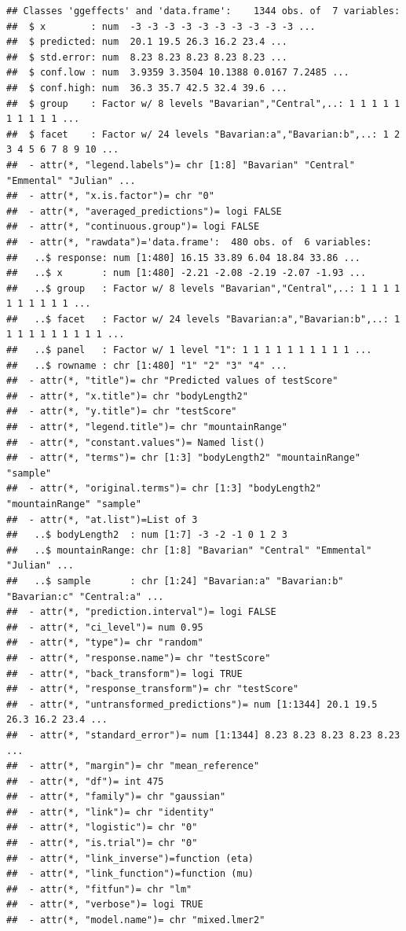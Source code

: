 \documentclass[
]{article}
\begin{document}
\begin{verbatim}
## Classes 'ggeffects' and 'data.frame':    1344 obs. of  7 variables:
##  $ x        : num  -3 -3 -3 -3 -3 -3 -3 -3 -3 -3 ...
##  $ predicted: num  20.1 19.5 26.3 16.2 23.4 ...
##  $ std.error: num  8.23 8.23 8.23 8.23 8.23 ...
##  $ conf.low : num  3.9359 3.3504 10.1388 0.0167 7.2485 ...
##  $ conf.high: num  36.3 35.7 42.5 32.4 39.6 ...
##  $ group    : Factor w/ 8 levels "Bavarian","Central",..: 1 1 1 1 1 1 1 1 1 1 ...
##  $ facet    : Factor w/ 24 levels "Bavarian:a","Bavarian:b",..: 1 2 3 4 5 6 7 8 9 10 ...
##  - attr(*, "legend.labels")= chr [1:8] "Bavarian" "Central" "Emmental" "Julian" ...
##  - attr(*, "x.is.factor")= chr "0"
##  - attr(*, "averaged_predictions")= logi FALSE
##  - attr(*, "continuous.group")= logi FALSE
##  - attr(*, "rawdata")='data.frame':  480 obs. of  6 variables:
##   ..$ response: num [1:480] 16.15 33.89 6.04 18.84 33.86 ...
##   ..$ x       : num [1:480] -2.21 -2.08 -2.19 -2.07 -1.93 ...
##   ..$ group   : Factor w/ 8 levels "Bavarian","Central",..: 1 1 1 1 1 1 1 1 1 1 ...
##   ..$ facet   : Factor w/ 24 levels "Bavarian:a","Bavarian:b",..: 1 1 1 1 1 1 1 1 1 1 ...
##   ..$ panel   : Factor w/ 1 level "1": 1 1 1 1 1 1 1 1 1 1 ...
##   ..$ rowname : chr [1:480] "1" "2" "3" "4" ...
##  - attr(*, "title")= chr "Predicted values of testScore"
##  - attr(*, "x.title")= chr "bodyLength2"
##  - attr(*, "y.title")= chr "testScore"
##  - attr(*, "legend.title")= chr "mountainRange"
##  - attr(*, "constant.values")= Named list()
##  - attr(*, "terms")= chr [1:3] "bodyLength2" "mountainRange" "sample"
##  - attr(*, "original.terms")= chr [1:3] "bodyLength2" "mountainRange" "sample"
##  - attr(*, "at.list")=List of 3
##   ..$ bodyLength2  : num [1:7] -3 -2 -1 0 1 2 3
##   ..$ mountainRange: chr [1:8] "Bavarian" "Central" "Emmental" "Julian" ...
##   ..$ sample       : chr [1:24] "Bavarian:a" "Bavarian:b" "Bavarian:c" "Central:a" ...
##  - attr(*, "prediction.interval")= logi FALSE
##  - attr(*, "ci_level")= num 0.95
##  - attr(*, "type")= chr "random"
##  - attr(*, "response.name")= chr "testScore"
##  - attr(*, "back_transform")= logi TRUE
##  - attr(*, "response_transform")= chr "testScore"
##  - attr(*, "untransformed_predictions")= num [1:1344] 20.1 19.5 26.3 16.2 23.4 ...
##  - attr(*, "standard_error")= num [1:1344] 8.23 8.23 8.23 8.23 8.23 ...
##  - attr(*, "margin")= chr "mean_reference"
##  - attr(*, "df")= int 475
##  - attr(*, "family")= chr "gaussian"
##  - attr(*, "link")= chr "identity"
##  - attr(*, "logistic")= chr "0"
##  - attr(*, "is.trial")= chr "0"
##  - attr(*, "link_inverse")=function (eta)  
##  - attr(*, "link_function")=function (mu)  
##  - attr(*, "fitfun")= chr "lm"
##  - attr(*, "verbose")= logi TRUE
##  - attr(*, "model.name")= chr "mixed.lmer2"
\end{verbatim}
\end{document}
